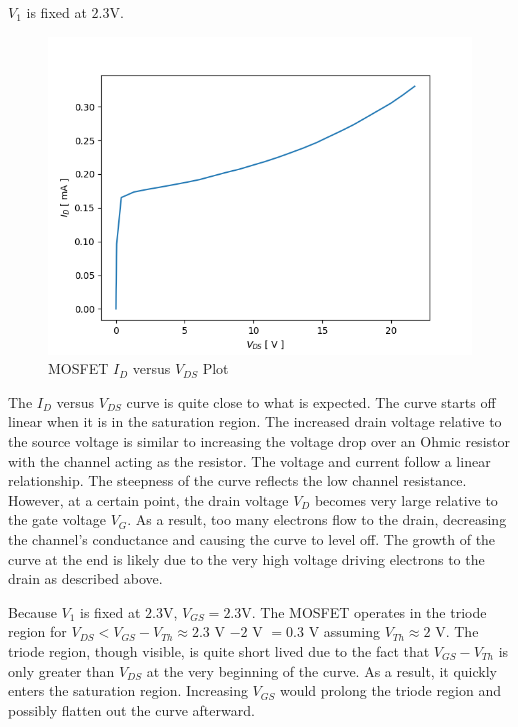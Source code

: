 \FloatBarrier

{\footnotesize $V_1$ is fixed at $2.3$\si{\volt}.}

\FloatBarrier

\FloatBarrier

\begin{figure}[h!]
	\centering
	\includegraphics[scale=0.75]{./images/mosfet_id_vds.PNG}
	\caption{MOSFET $I_D$ versus $V_{DS}$ Plot}
	\label{fig:mosfet_id_vds}
\end{figure}

\FloatBarrier

The $I_D$ versus $V_{DS}$ curve is quite close to what is expected. The curve starts off linear when it is in the saturation region. The increased drain voltage relative to the source voltage is similar to increasing the voltage drop over an Ohmic resistor with the channel acting as the resistor. The voltage and current follow a linear relationship. The steepness of the curve reflects the low channel resistance. However, at a certain point, the drain voltage $V_{D}$ becomes very large relative to the gate voltage $V_{G}$. As a result, too many electrons flow to the drain, decreasing the channel's conductance and causing the curve to level off. The growth of the curve at the end is likely due to the very high voltage driving electrons to the drain as described above.

Because $V_1$ is fixed at $2.3$\si{\volt}, $V_{GS} = 2.3$\si{\volt}. The MOSFET operates in the triode region for $V_{DS} < V_{GS} - V_{Th} \approx 2.3$ \si{\volt} $ - 2$ \si{\volt} $ = 0.3$ \si{\volt} assuming $V_{Th} \approx 2$ \si{\volt}. The triode region, though visible, is quite short lived due to the fact that $V_{GS} - V_{Th}$ is only greater than $V_{DS}$ at the very beginning of the curve. As a result, it quickly enters the saturation region. Increasing $V_{GS}$ would prolong the triode region and possibly flatten out the curve afterward.
